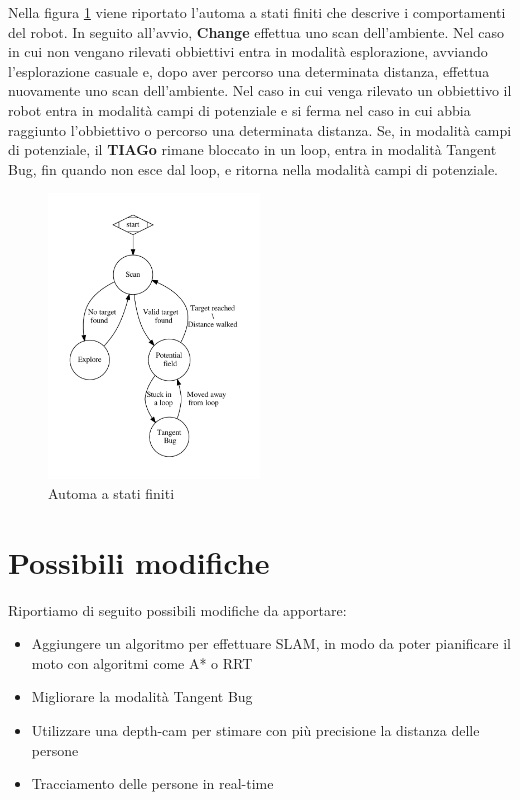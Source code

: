 \documentclass[a4paper]{article}
\begin{document}
	Nella figura \ref{fig:fsa} viene riportato l'automa a stati finiti che
	descrive i comportamenti del robot. In seguito all'avvio, \textbf{Change}
	effettua uno scan dell'ambiente. Nel caso in cui non vengano rilevati
	obbiettivi entra in modalità esplorazione, avviando l'esplorazione casuale
	e, dopo aver percorso una determinata distanza, effettua nuovamente uno
	scan dell'ambiente. Nel caso in cui venga rilevato un obbiettivo il robot
	entra in modalità campi di potenziale e si ferma nel caso in cui abbia
	raggiunto l'obbiettivo o percorso una determinata distanza. Se, in modalità
	campi di potenziale, il \textbf{TIAGo} rimane bloccato in un loop, entra in
	modalità Tangent Bug, fin quando non esce dal loop, e ritorna nella
	modalità campi di potenziale.
	
	\begin{figure}[H]
		\centering
		\includegraphics[width=0.5\textwidth]{./img/fsa.pdf}
		\caption{Automa a stati finiti }
		\label{fig:fsa}
	\end{figure}
	
	\section{Possibili modifiche}\label{sec:Possibli-modifiche}
	Riportiamo di seguito possibili modifiche da apportare:
	\begin{itemize}
		\item Aggiungere un algoritmo per effettuare SLAM, in modo da poter
			pianificare il moto con algoritmi come A* \cite{A*} o RRT
			\cite{RRT}
		\item Migliorare la modalità Tangent Bug
		\item Utilizzare una depth-cam per stimare con più precisione la
			distanza delle persone
		\item Tracciamento delle persone in real-time
	\end{itemize}
\end{document}
